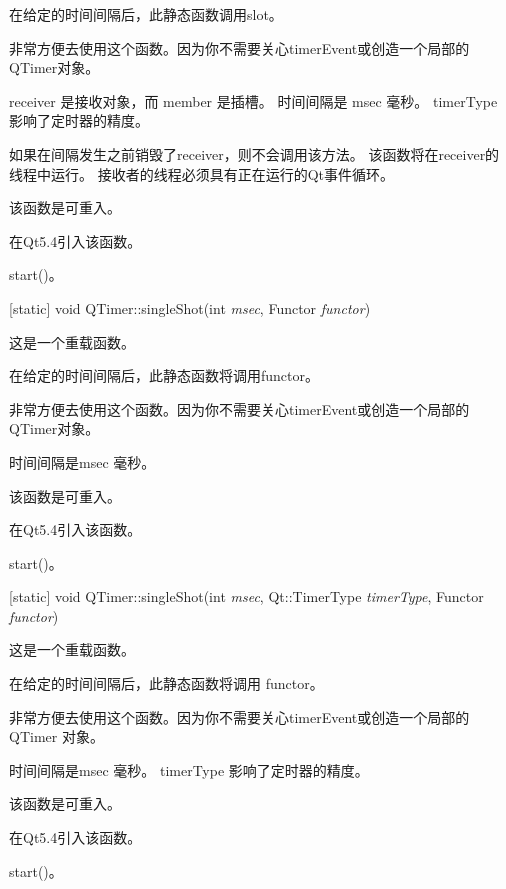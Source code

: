 在给定的时间间隔后，此静态函数调用slot。

非常方便去使用这个函数。因为你不需要关心timerEvent或创造一个局部的QTimer对象。

receiver 是接收对象，而 member 是插槽。 时间间隔是 msec 毫秒。 timerType 影响了定时器的精度。

如果在间隔发生之前销毁了receiver，则不会调用该方法。 该函数将在receiver的线程中运行。 接收者的线程必须具有正在运行的Qt事件循环。

\begin{notice}
该函数是可重入。
\end{notice}

在Qt5.4引入该函数。

\begin{seeAlso}
start()。
\end{seeAlso}

[static] void QTimer::singleShot(int \emph{msec}, Functor \emph{functor})

这是一个重载函数。

在给定的时间间隔后，此静态函数将调用functor。

非常方便去使用这个函数。因为你不需要关心timerEvent或创造一个局部的QTimer对象。

时间间隔是msec 毫秒。

\begin{notice}
该函数是可重入。
\end{notice}

在Qt5.4引入该函数。

\begin{seeAlso}
start()。
\end{seeAlso}

[static] void QTimer::singleShot(int \emph{msec}, Qt::TimerType \emph{timerType}, Functor \emph{functor})

这是一个重载函数。

在给定的时间间隔后，此静态函数将调用 functor。

非常方便去使用这个函数。因为你不需要关心timerEvent或创造一个局部的 QTimer 对象。

时间间隔是msec 毫秒。 timerType 影响了定时器的精度。

\begin{notice}
该函数是可重入。
\end{notice}
	

在Qt5.4引入该函数。

\begin{seeAlso}
start()。
\end{seeAlso}

